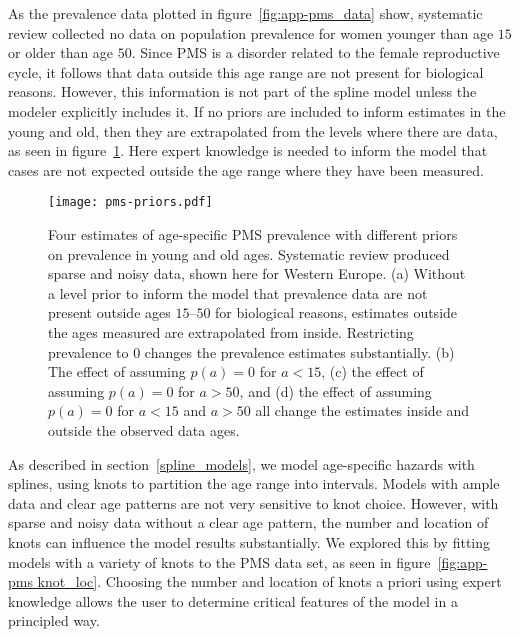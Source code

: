 As the prevalence data plotted in figure~\ref{fig:app-pms_data} show,
systematic review collected no data on population prevalence for women
younger than age $15$ or older than age $50$.  Since PMS is a disorder
related to the female reproductive cycle, it follows that data outside
this age range are not present for biological reasons.  However, this
information is not part of the spline model unless the modeler
explicitly includes it.  If no priors are included to inform estimates
in the young and old, then they are extrapolated from the levels where
there are data, as seen in figure~\ref{fig:app-pms prios_on_level}.
Here expert knowledge is needed to inform the model that cases are not
expected outside the age range where they have been measured.

    \begin{figure}
        \begin{center}
            \texttt{[image: pms-priors.pdf]}
        \end{center}
        \caption[Four estimates of age-specific PMS prevalence with
          different priors on prevalence in young and old ages]{Four
          estimates of age-specific PMS prevalence with different
          priors on prevalence in young and old ages.  Systematic
          review produced sparse and noisy data, shown here for
          Western Europe.  (a) Without a level prior to inform the
          model that prevalence data are not present outside
          ages $15$--$50$ for biological reasons, estimates outside the
          ages measured are extrapolated from inside.  Restricting
          prevalence to $0$ changes the prevalence estimates
          substantially. (b) The effect of assuming $p(a) = 0$ for
          $a<15$, (c) the effect of assuming $p(a) = 0$ for $a>50$,
          and (d) the effect of assuming $p(a) = 0$ for $a<15$ and
          $a>50$ all change the estimates inside and outside the
          observed data ages.}
        \label{fig:app-pms prios_on_level}
    \end{figure}


As described in
section~\ref{spline_models}, we model
age-specific hazards with splines, using knots to partition the age
range into intervals.  Models with ample data and clear age patterns
are not very sensitive to knot choice.  However, with sparse and
noisy data without a clear age pattern, the number and location of
knots can influence the model results substantially.  We explored this
by fitting models with a variety of knots to the PMS data set, as seen
in figure~\ref{fig:app-pms knot_loc}.  Choosing the number and
location of knots a priori using expert knowledge allows the user to
determine critical features of the model in a principled way.

